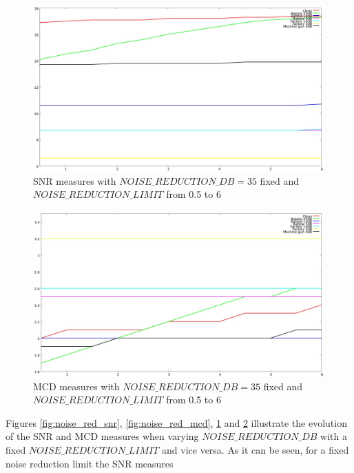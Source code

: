 \begin{figure}[!htb]
\begin{centering}
\includegraphics[width=\textwidth]{images/noise_red_lim_snr_exp.jpg}
\caption{SNR measures with $NOISE\_REDUCTION\_DB = 35$ fixed and $NOISE\_REDUCTION\_LIMIT$ from 0.5 to 6}
\label{fig:noise_red_lim_snr}
\end{centering}
\end{figure}

\begin{figure}[!htb]
\begin{centering}
\includegraphics[width=\textwidth]{images/noise_red_lim_mcd_exp.jpg}
\caption{MCD measures with $NOISE\_REDUCTION\_DB = 35$ fixed and $NOISE\_REDUCTION\_LIMIT$ from 0.5 to 6}
\label{fig:noise_red_lim_mcd}
\end{centering}
\end{figure}
Figures \ref{fig:noise_red_snr}, \ref{fig:noise_red_mcd}, \ref{fig:noise_red_lim_snr} and \ref{fig:noise_red_lim_mcd} illustrate the evolution of the SNR and MCD measures when varying $NOISE\_REDUCTION\_DB$ with a fixed $NOISE\_REDUCTION\_LIMIT$ and vice versa.
%
As it can be seen, for a fixed noise reduction limit the SNR measures 